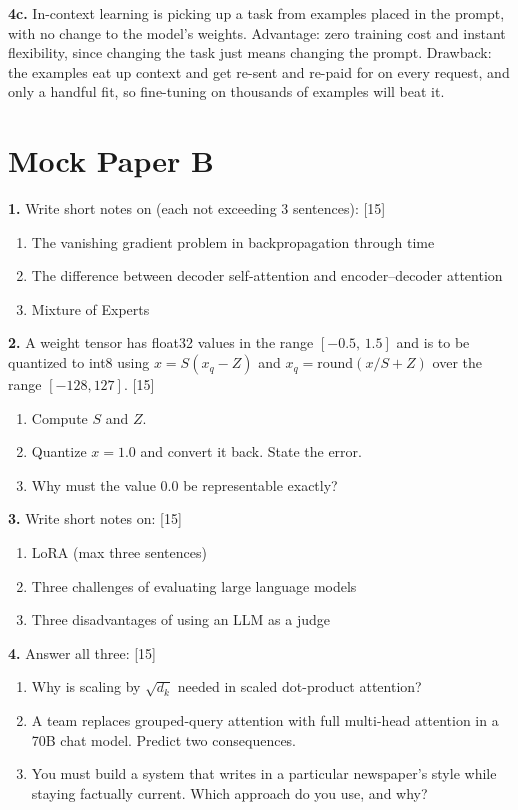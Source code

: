 \documentclass[11pt]{article}
\begin{document}
\textbf{4c.} In-context learning is picking up a task from examples placed in the prompt, with
no change to the model's weights. Advantage: zero training cost and instant flexibility, since
changing the task just means changing the prompt. Drawback: the examples eat up context and
get re-sent and re-paid for on every request, and only a handful fit, so fine-tuning on
thousands of examples will beat it.

\section{Mock Paper B}

\textbf{1.} Write short notes on (each not exceeding 3 sentences): \hfill [15]
\begin{enumerate}[label=\alph*.]
  \item The vanishing gradient problem in backpropagation through time
  \item The difference between decoder self-attention and encoder--decoder attention
  \item Mixture of Experts
\end{enumerate}

\textbf{2.} A weight tensor has float32 values in the range $[-0.5,\,1.5]$ and is to be
quantized to int8 using $x=S(x_q-Z)$ and $x_q=\mathrm{round}(x/S+Z)$ over the range
$[-128,127]$. \hfill [15]
\begin{enumerate}[label=\alph*.]
  \item Compute $S$ and $Z$.
  \item Quantize $x=1.0$ and convert it back. State the error.
  \item Why must the value $0.0$ be representable exactly?
\end{enumerate}

\textbf{3.} Write short notes on: \hfill [15]
\begin{enumerate}[label=\alph*.]
  \item LoRA (max three sentences)
  \item Three challenges of evaluating large language models
  \item Three disadvantages of using an LLM as a judge
\end{enumerate}

\textbf{4.} Answer all three: \hfill [15]
\begin{enumerate}[label=\alph*.]
  \item Why is scaling by $\sqrt{d_k}$ needed in scaled dot-product attention?
  \item A team replaces grouped-query attention with full multi-head attention in a 70B chat model. Predict two consequences.
  \item You must build a system that writes in a particular newspaper's style while staying factually current. Which approach do you use, and why?
\end{enumerate}
\end{document}
